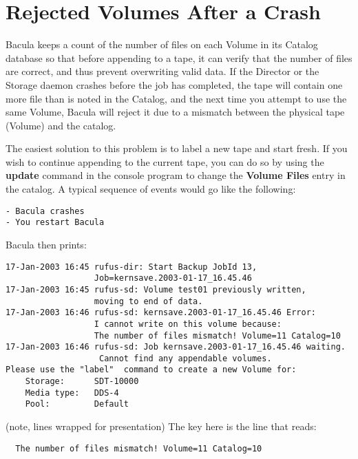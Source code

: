 \section{Rejected Volumes After a Crash}
\label{RejectedVolumes}

Bacula keeps a count of the number of files on each Volume in its Catalog
database so that before appending to a tape, it can verify that the number of
files are correct, and thus prevent overwriting valid data. If the Director or
the Storage daemon crashes before the job has completed, the tape will contain
one more file than is noted in the Catalog, and the next time you attempt to
use the same Volume, Bacula will reject it due to a mismatch between the
physical tape (Volume) and the catalog.

The easiest solution to this problem is to label a new tape and start fresh.
If you wish to continue appending to the current tape, you can do so by using
the {\bf update} command in the console program to change the {\bf Volume
Files} entry in the catalog. A typical sequence of events would go like the
following:

\footnotesize
\begin{verbatim}
- Bacula crashes
- You restart Bacula
\end{verbatim}
\normalsize

Bacula then prints:

\footnotesize
\begin{verbatim}
17-Jan-2003 16:45 rufus-dir: Start Backup JobId 13,
                  Job=kernsave.2003-01-17_16.45.46
17-Jan-2003 16:45 rufus-sd: Volume test01 previously written,
                  moving to end of data.
17-Jan-2003 16:46 rufus-sd: kernsave.2003-01-17_16.45.46 Error:
                  I cannot write on this volume because:
                  The number of files mismatch! Volume=11 Catalog=10
17-Jan-2003 16:46 rufus-sd: Job kernsave.2003-01-17_16.45.46 waiting.
                   Cannot find any appendable volumes.
Please use the "label"  command to create a new Volume for:
    Storage:      SDT-10000
    Media type:   DDS-4
    Pool:         Default
\end{verbatim}
\normalsize

(note, lines wrapped for presentation)
The key here is the line that reads:

\footnotesize
\begin{verbatim}
  The number of files mismatch! Volume=11 Catalog=10
\end{verbatim}
\normalsize

